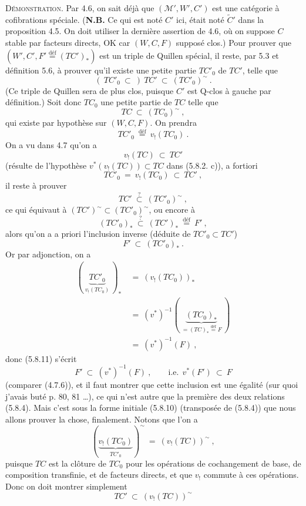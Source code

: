 \documentclass[11pt]{article}
\newcommand{\printedpage}[1]{\marginpar{\footnotesize p.~#1}}
\newcommand{\msp}[1]{\marginpar{\footnotesize [#1]}}
\newcommand{\defeq}{\overset{\text{déf}}{=}}
\newcommand{\cl}{^{\sim}}%
\begin{document}
\msp{page 92}
\textsc{Démonstration}. Par 4.6, on sait déjà que $(\mathcal{M}', W', C')$ est une catégorie à cofibrations spéciale. (\textbf{N.B.} Ce qui est noté $C'$ ici, était noté $\tilde{C}'$ dans la proposition 4.5. On doit utiliser la dernière assertion de 4.6, où on suppose $C$ stable par facteurs directs, OK car $(W, C, F)$ supposé clos.) Pour prouver que $(W', C', F' \defeq (TC')_*)$ est un triple de Quillen
\printedpage{46}
spécial, il reste, par 5.3 et définition 5.6, à prouver qu'il existe une petite partie $TC'_0$ de $TC'$, telle que
\[
(\ TC'_0 \ \subset\ )\ TC' \ \subset \ (TC'_0)\cl\ .
\tag*{(5.8.6)}
\]
(Ce triple de Quillen sera de plus clos, puisque $C'$ est Q-clos à gauche par définition.) Soit donc $TC_0$ une petite partie de $TC$ telle que
\[
TC \ \subset \ (TC_0)\cl\ ,
\tag*{(5.8.7)}
\]
qui existe par hypothèse sur $(W, C, F)$. On prendra
\[
TC'_0 \ \defeq \ v_!(TC_0)\ .
\tag*{(5.8.8)}
\]
On a vu dans 4.7 qu'on a
\[
v_!(TC) \ \subset \ TC'
\tag*{(5.8.9)}
\]
(résulte de l'hypothèse $v^*(v_!(TC)) \subset TC$ dans (5.8.2. c)), a fortiori
\[
TC'_0 \ = \ v_!(TC_0) \ \subset \ TC'\ ,
\]
\msp{page 93}
il reste à prouver
\[
TC' \ \overset{?}{\subset} \ (TC'_0)\cl\ ,
\tag*{(5.8.10)}
\]
ce qui équivaut à $(TC')\cl \subset (TC'_0)\cl$, ou encore à
\[
(TC'_0)_* \ \overset{?}{\subset} \ (TC')_* \ \defeq \ F'\ ,
\tag*{(5.8.10 bis)}
\]
alors qu'on a a priori l'inclusion inverse (déduite de $TC'_0 \subset TC'$)
\[
F' \ \subset \ (TC'_0)_*\ .
\tag*{(5.8.11)}
\]
Or par adjonction, on a
\[
\begin{aligned}
(\ \underbrace{TC'_0}_{v_!(TC_0)}\ )_* \ &= \ (v_!(TC_0))_*\\
&= \ (v^*)^{-1}(\ \underbrace{(TC_0)_*}_{= (TC)_* \defeq F}\ )\\
&= \ (v^*)^{-1}(F)\ ,
\end{aligned}
\]
donc (5.8.11) s'écrit
\[
F' \ \subset \ (v^*)^{-1}(F)\ , \qquad \text{i.e.}\ \ v^*(F') \ \subset \ F
\tag*{(5.8.12)}
\]
(comparer (4.7.6)), et il faut montrer que cette inclusion est une égalité (sur quoi j'avais buté p. 80, 81 \ldots), ce qui n'est autre que la première des deux relations (5.8.4). Mais c'est sous la forme initiale (5.8.10) (transposée de (5.8.4)) que nous allons prouver la chose, finalement. Notons que l'on a
\printedpage{47}
\msp{page 94}
\[
(\underbrace{v_!(TC_0)}_{TC'_0})\cl \ = \ (v_!(TC))\cl\ ,
\]
puisque $TC$ est la clôture de $TC_0$ pour les opérations de cochangement de base, de composition transfinie, et de facteurs directs, et que $v_!$ commute à ces opérations. Donc on doit montrer simplement
\[
TC' \ \subset \ (v_!(TC))\cl
\tag*{(5.8.12 bis)}
\]
\end{document}
